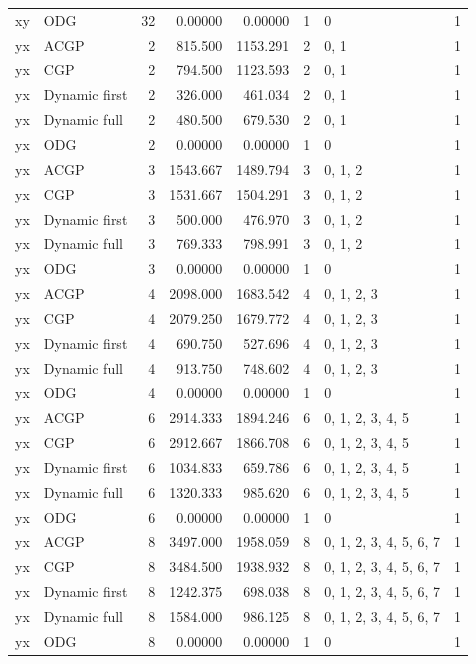 \documentclass[10pt,a4paper]{article}
\begin{document}
\begin{longtable}{@{}p{23mm}p{29mm}rrrrp{36mm}r@{}}
xy & ODG & 32 & 0.00000 & 0.00000 & 1 & 0 & 1 \\
yx & ACGP & 2 & 815.500 & 1153.291 & 2 & 0, 1 & 1 \\
yx & CGP & 2 & 794.500 & 1123.593 & 2 & 0, 1 & 1 \\
yx & Dynamic first & 2 & 326.000 & 461.034 & 2 & 0, 1 & 1 \\
yx & Dynamic full & 2 & 480.500 & 679.530 & 2 & 0, 1 & 1 \\
yx & ODG & 2 & 0.00000 & 0.00000 & 1 & 0 & 1 \\
yx & ACGP & 3 & 1543.667 & 1489.794 & 3 & 0, 1, 2 & 1 \\
yx & CGP & 3 & 1531.667 & 1504.291 & 3 & 0, 1, 2 & 1 \\
yx & Dynamic first & 3 & 500.000 & 476.970 & 3 & 0, 1, 2 & 1 \\
yx & Dynamic full & 3 & 769.333 & 798.991 & 3 & 0, 1, 2 & 1 \\
yx & ODG & 3 & 0.00000 & 0.00000 & 1 & 0 & 1 \\
yx & ACGP & 4 & 2098.000 & 1683.542 & 4 & 0, 1, 2, 3 & 1 \\
yx & CGP & 4 & 2079.250 & 1679.772 & 4 & 0, 1, 2, 3 & 1 \\
yx & Dynamic first & 4 & 690.750 & 527.696 & 4 & 0, 1, 2, 3 & 1 \\
yx & Dynamic full & 4 & 913.750 & 748.602 & 4 & 0, 1, 2, 3 & 1 \\
yx & ODG & 4 & 0.00000 & 0.00000 & 1 & 0 & 1 \\
yx & ACGP & 6 & 2914.333 & 1894.246 & 6 & 0, 1, 2, 3, 4, 5 & 1 \\
yx & CGP & 6 & 2912.667 & 1866.708 & 6 & 0, 1, 2, 3, 4, 5 & 1 \\
yx & Dynamic first & 6 & 1034.833 & 659.786 & 6 & 0, 1, 2, 3, 4, 5 & 1 \\
yx & Dynamic full & 6 & 1320.333 & 985.620 & 6 & 0, 1, 2, 3, 4, 5 & 1 \\
yx & ODG & 6 & 0.00000 & 0.00000 & 1 & 0 & 1 \\
yx & ACGP & 8 & 3497.000 & 1958.059 & 8 & 0, 1, 2, 3, 4, 5, 6, 7 & 1 \\
yx & CGP & 8 & 3484.500 & 1938.932 & 8 & 0, 1, 2, 3, 4, 5, 6, 7 & 1 \\
yx & Dynamic first & 8 & 1242.375 & 698.038 & 8 & 0, 1, 2, 3, 4, 5, 6, 7 & 1 \\
yx & Dynamic full & 8 & 1584.000 & 986.125 & 8 & 0, 1, 2, 3, 4, 5, 6, 7 & 1 \\
yx & ODG & 8 & 0.00000 & 0.00000 & 1 & 0 & 1 \\

\end{longtable}
\end{document}
